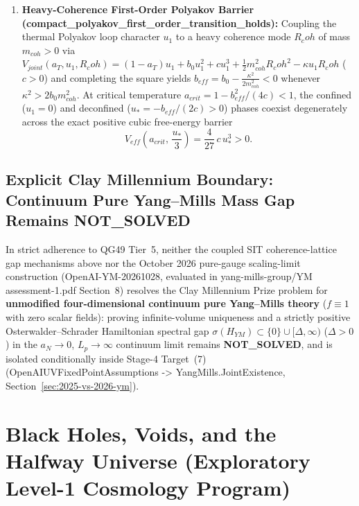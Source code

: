 \documentclass[american,11pt,letterpaper]{article}
\newcommand{\Rcoh}{R_{\mathrm{coh}}}
\def\mathrm#1{#1}%
\def\texttt#1{#1}%
\def\Rcoh{R_coh}%
\begin{document}
\begin{enumerate}[leftmargin=2em]
  \item \textbf{Heavy-Coherence First-Order Polyakov Barrier (\texttt{compact\_\allowbreak{}polyakov\_\allowbreak{}first\_\allowbreak{}order\_\allowbreak{}transition\_\allowbreak{}holds}):} Coupling the thermal Polyakov loop character $u_1$ to a heavy coherence mode $\Rcoh$ of mass $m_{\mathrm{coh}} > 0$ via $V_{\mathrm{joint}}(a_T, u_1, \Rcoh) = (1-a_T)u_1 + b_0 u_1^2 + c u_1^3 + \frac{1}{2}m_{\mathrm{coh}}^2\Rcoh^2 - \kappa u_1\Rcoh$ ($c > 0$) and completing the square yields $b_{\mathrm{eff}} = b_0 - \frac{\kappa^2}{2 m_{\mathrm{coh}}^2} < 0$ whenever $\kappa^2 > 2 b_0 m_{\mathrm{coh}}^2$. At critical temperature $a_{\mathrm{crit}} = 1 - b_{\mathrm{eff}}^2/(4c) < 1$, the confined ($u_1 = 0$) and deconfined ($u_* = -b_{\mathrm{eff}}/(2c) > 0$) phases coexist degenerately across the exact positive cubic free-energy barrier
  \begin{equation}
  V_{\mathrm{eff}}\!\left(a_{\mathrm{crit}},\,\frac{u_*}{3}\right) = \frac{4}{27}\,c\,u_*^3 > 0.
  \label{eq:sec49_polyakov_barrier}
  \end{equation}
\end{enumerate}

\subsection{Explicit Clay Millennium Boundary: Continuum Pure Yang--Mills Mass Gap Remains \texttt{NOT\_SOLVED}}

In strict adherence to \texttt{QG49} Tier~5, neither the coupled SIT coherence-lattice gap mechanisms above nor the October 2026 pure-gauge scaling-limit construction (\texttt{OpenAI-YM-20261028}, evaluated in \texttt{yang-mills-group/YM} \texttt{assessment-1.pdf} Section~8) resolves the Clay Millennium Prize problem for \textbf{unmodified four-dimensional continuum pure Yang--Mills theory} ($f \equiv 1$ with zero scalar fields): proving infinite-volume uniqueness and a strictly positive Osterwalder--Schrader Hamiltonian spectral gap $\sigma(H_{\mathrm{YM}}) \subset \{0\} \cup [\Delta, \infty)$ ($\Delta > 0$) in the $a_N \to 0$, $L_p \to \infty$ continuum limit remains \textbf{\texttt{NOT\_SOLVED}}, and is isolated conditionally inside Stage-4 Target~\texttt{(7)} (\texttt{Open\allowbreak{}AIUVFixed\allowbreak{}Point\allowbreak{}Assumptions -> Yang\allowbreak{}Mills.\allowbreak{}Joint\allowbreak{}Existence}, Section~\ref{sec:2025-vs-2026-ym}).

\section{Black Holes, Voids, and the Halfway Universe (Exploratory Level-1 Cosmology Program)}
\label{sec:black-holes-voids}
\label{sec:blackholesvoids}
\end{document}
